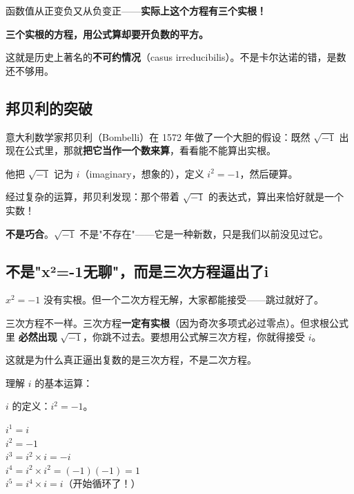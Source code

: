 函数值从正变负又从负变正——\textbf{实际上这个方程有三个实根！}

\textbf{三个实根的方程，用公式算却要开负数的平方。}

这就是历史上著名的\textbf{不可约情况}（casus irreducibilis）。不是卡尔达诺的错，是数还不够用。

\subsection*{邦贝利的突破}

意大利数学家邦贝利（Bombelli）在 1572 年做了一个大胆的假设：既然 $\sqrt{-1}$ 出现在公式里，那就\textbf{把它当作一个数来算}，看看能不能算出实根。

他把 $\sqrt{-1}$ 记为 $i$（imaginary，想象的），定义 $i^2 = -1$，然后硬算。

经过复杂的运算，邦贝利发现：那个带着 $\sqrt{-1}$ 的表达式，算出来恰好就是一个实数！

\textbf{不是巧合}。$\sqrt{-1}$ 不是"不存在"——它是一种新数，只是我们以前没见过它。

\subsection*{不是"x²=-1无聊"，而是三次方程逼出了i}

$x^2 = -1$ 没有实根。但一个二次方程无解，大家都能接受——跳过就好了。

三次方程不一样。三次方程\textbf{一定有实根}（因为奇次多项式必过零点）。但求根公式里 \textbf{必然出现} $\sqrt{-1}$，你跳不过去。要想用公式解三次方程，你就得接受 $i$。

这就是为什么真正逼出复数的是三次方程，不是二次方程。

\begin{example}
理解 $i$ 的基本运算：
\end{example}
\begin{solution}
$i$ 的定义：$i^2 = -1$。

$i^1 = i$\\
$i^2 = -1$\\
$i^3 = i^2 \times i = -i$\\
$i^4 = i^2 \times i^2 = (-1)(-1) = 1$\\
$i^5 = i^4 \times i = i$（开始循环了！）
\end{solution}

